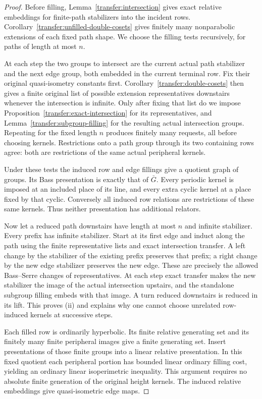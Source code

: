 \begin{proof}
Before filling, Lemma~\ref{transfer:intersection} gives exact relative
embeddings for finite-path stabilizers into the incident rows.
Corollary~\ref{transfer:unfilled-double-cosets} gives finitely many
nonparabolic extensions of each fixed path shape. We choose the
filling tests recursively, for paths of length at most $n$.

At each step the two groups to intersect are the current actual path
stabilizer and the next edge group, both embedded in the current
terminal row. Fix their original quasi-isometry constants first.
Corollary~\ref{transfer:double-cosets} then gives a finite original
list of possible extension representatives downstairs whenever the
intersection is infinite. Only after fixing that list do we impose
Proposition~\ref{transfer:exact-intersection} for its representatives,
and Lemma~\ref{transfer:subgroup-filling} for the resulting actual
intersection groups. Repeating for the fixed length $n$ produces
finitely many requests, all before choosing kernels. Restrictions
onto a path group through its two containing rows agree: both are
restrictions of the same actual peripheral kernels.

Under these tests the induced row and edge fillings give a quotient
graph of groups. Its Bass presentation is exactly that of $\bar G$.
Every periodic kernel is imposed at an included place of its line,
and every extra cyclic kernel at a place fixed by that cyclic.
Conversely all induced row relations are restrictions of these same
kernels. Thus neither presentation has additional relators.

Now let a reduced path downstairs have length at most $n$ and infinite
stabilizer. Every prefix has infinite stabilizer. Start at its first
edge and induct along the path using the finite representative lists
and exact intersection transfer. A left change by the stabilizer of
the existing prefix preserves that prefix; a right change by the
new edge stabilizer preserves the new edge. These are precisely the
allowed Bass--Serre changes of representatives. At each step exact
transfer makes the new stabilizer the image of the actual intersection
upstairs, and the standalone subgroup filling embeds with that image.
A turn reduced downstairs is reduced in its lift. This proves (ii)
and explains why one cannot choose unrelated row-induced kernels
at successive steps.

Each filled row is ordinarily hyperbolic. Its finite relative
generating set and its finitely many finite peripheral images give
a finite generating set. Insert presentations of those finite groups
into a linear relative presentation. In this fixed quotient each
peripheral portion has bounded linear ordinary filling cost, yielding
an ordinary linear isoperimetric inequality. This argument requires
no absolute finite generation of the original height kernels.
The induced relative embeddings give quasi-isometric edge maps.


\end{proof}
